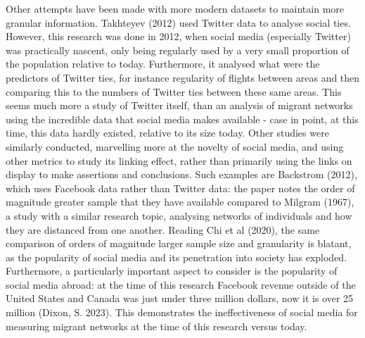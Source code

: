 \documentclass[12pt]{article}
\begin{document}
Other attempts have been made with more modern datasets to maintain more granular 
information. Takhteyev (2012) used Twitter data to analyse social ties. However, this 
research was done in 2012, when social media (especially Twitter) was practically 
nascent, only being regularly used by a very small proportion of the population 
relative to today. Furthermore, it analysed what were the predictors of Twitter ties, 
for instance regularity of flights between areas and then comparing this to the 
numbers of Twitter ties between these same areas. This seems much more a study 
of Twitter itself, than an analysis of migrant networks using the incredible data that 
social media makes available - case in point, at this time, this data hardly existed, 
relative to its size today. Other studies were similarly conducted, marvelling more 
at the novelty of social media, and using other metrics to study its linking effect, 
rather than primarily using the links on display to make assertions and conclusions. 
Such examples are Backstrom (2012), which uses Facebook data rather than Twitter data: 
the paper notes the order of magnitude greater sample that they have available compared 
to Milgram (1967), a study with a similar research topic, analysing networks of individuals 
and how they are distanced from one another. Reading Chi et al (2020), the same comparison 
of orders of magnitude larger sample size and granularity is blatant, as the popularity 
of social media and its penetration into society has exploded. Furthermore, a particularly  
important aspect to consider is the popularity of social media abroad: at the time of this 
research Facebook revenue outside of the United States and Canada was just under three
million dollars, now it is over 25 million (Dixon, S. 2023). This demonstrates the ineffectiveness of social 
media for measuring migrant networks at the time of this research versus today.
\end{document}
